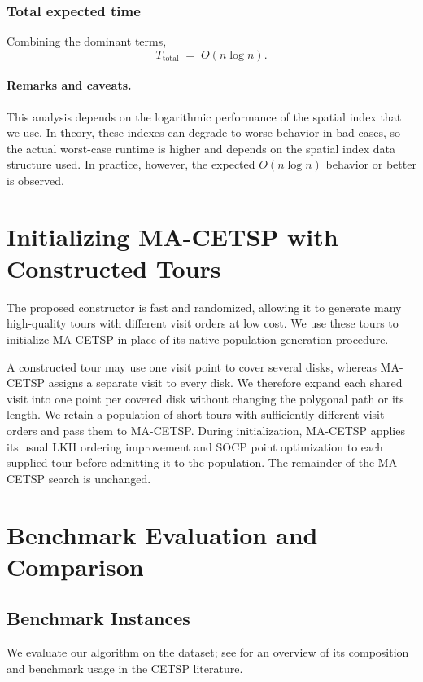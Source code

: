 \documentclass[11pt]{article}
\begin{document}
\subsubsection{Total expected time}
Combining the dominant terms,
\[
T_{\text{total}} \;=\; O(n \log n).
\]

\paragraph{Remarks and caveats.} This analysis depends on the logarithmic performance of the spatial index that we use. In theory, these indexes can degrade to worse behavior in bad cases, so the actual worst-case runtime is higher and depends on the spatial index data structure used. In practice, however, the expected $O(n \log n)$ behavior or better is observed.

\section{Initializing MA-CETSP with Constructed Tours}

The proposed constructor is fast and randomized, allowing it to generate many high-quality tours with different visit orders at low cost. We use these tours to initialize MA-CETSP \parencite{LeiHao2024} in place of its native population generation procedure.

A constructed tour may use one visit point to cover several disks, whereas MA-CETSP assigns a separate visit to every disk. We therefore expand each shared visit into one point per covered disk without changing the polygonal path or its length. We retain a population of short tours with sufficiently different visit orders and pass them to MA-CETSP. During initialization, MA-CETSP applies its usual LKH ordering improvement and SOCP point optimization to each supplied tour before admitting it to the population. The remainder of the MA-CETSP search is unchanged.

\section{Benchmark Evaluation and Comparison}

\subsection{Benchmark Instances}

We evaluate our algorithm on the \textcite{Mennell2009} dataset; see \textcite{LeiHao2024} for an overview of its composition and benchmark usage in the CETSP literature.
\end{document}
